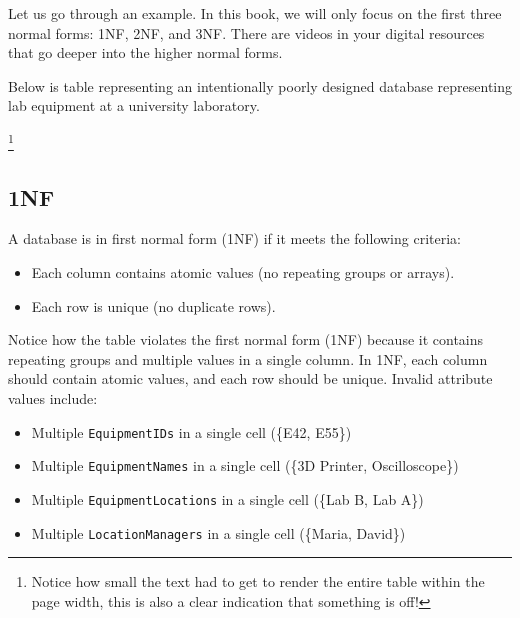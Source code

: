Let us go through an example. In this book, we will only focus on the first three normal forms: 1NF, 2NF, and 3NF. There are videos in your digital resources that go deeper into the higher normal forms.

Below is table representing an intentionally poorly designed database representing lab equipment at a university laboratory.

\begin{table}[h]
\centering
\small
\caption{Equipment Checkout Log}
\label{tab:equipment_orig}
\end{table}

\footnote{Notice how small the text had to get to render the entire table within the page width, this is also a clear indication that something is off!}
\subsection{1NF}
A database is in first normal form (1NF) if it meets the following criteria:
\begin{itemize}
    \item Each column contains atomic values (no repeating groups or arrays).
    \item Each row is unique (no duplicate rows).
\end{itemize}

Notice how the table violates the first normal form (1NF) because it contains repeating groups and multiple values in a single column. In 1NF, each column should contain atomic values, and each row should be unique.
Invalid attribute values include:
\begin{itemize}
    \item Multiple \texttt{EquipmentIDs} in a single cell (\{E42, E55\})
    \item Multiple \texttt{EquipmentNames} in a single cell (\{3D Printer, Oscilloscope\})
    \item Multiple \texttt{EquipmentLocations} in a single cell (\{Lab B, Lab A\})
    \item Multiple \texttt{LocationManagers} in a single cell (\{Maria, David\})
\end{itemize}


